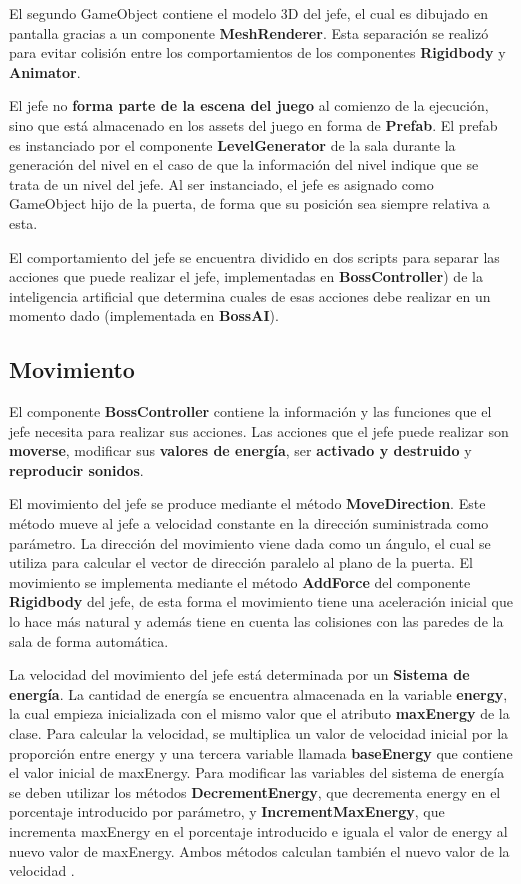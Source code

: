 El segundo GameObject contiene el modelo 3D del jefe, el cual es dibujado en pantalla gracias a un componente \textbf{MeshRenderer}. Esta separación se realizó para evitar colisión entre los comportamientos de los componentes \textbf{Rigidbody} y \textbf{Animator}.

El jefe no \textbf{forma parte de la escena del juego} al comienzo de la ejecución, sino que está almacenado en los assets del juego en forma de \textbf{Prefab}. El prefab es instanciado por el componente \textbf{LevelGenerator} de la sala durante la generación del nivel en el caso de que la información del nivel indique que se trata de un nivel del jefe. Al ser instanciado, el jefe es asignado como GameObject hijo de la puerta, de forma que su posición sea siempre relativa a esta.

El comportamiento del jefe se encuentra dividido en dos scripts para separar las acciones que puede realizar el jefe, implementadas en \textbf{BossController}) de la inteligencia artificial que determina cuales de esas acciones debe realizar en un momento dado (implementada en \textbf{BossAI}). 

\subsection{Movimiento}
El componente \textbf{BossController} contiene la información y las funciones que el jefe necesita para realizar sus acciones. Las acciones que el jefe puede realizar son \textbf{moverse}, modificar sus \textbf{valores de energía}, ser \textbf{activado y destruido} y \textbf{reproducir sonidos}.

El movimiento del jefe se produce mediante el método \textbf{MoveDirection}. Este método mueve al jefe a velocidad constante en la dirección suministrada como parámetro. La dirección del movimiento viene dada como un ángulo, el cual se utiliza para calcular el vector de dirección paralelo al plano de la puerta. El movimiento se implementa mediante el método \textbf{AddForce} del componente \textbf{Rigidbody} del jefe, de esta forma el movimiento tiene una aceleración inicial que lo hace más natural y además tiene en cuenta las colisiones con las paredes de la sala de forma automática.

La velocidad del movimiento del jefe está determinada por un \textbf{Sistema de energía}. La cantidad de energía se encuentra almacenada en la variable \textbf{energy}, la cual empieza inicializada con el mismo valor que el atributo \textbf{maxEnergy} de la clase. Para calcular la velocidad, se multiplica un valor de velocidad inicial por la proporción entre energy y una tercera variable llamada \textbf{baseEnergy} que contiene el valor inicial de maxEnergy. Para modificar las variables del sistema de energía se deben utilizar los métodos \textbf{DecrementEnergy}, que decrementa energy en el porcentaje introducido por parámetro, y \textbf{IncrementMaxEnergy}, que incrementa maxEnergy en el porcentaje introducido e iguala el valor de energy al nuevo valor de maxEnergy. Ambos métodos calculan también el nuevo valor de la velocidad .

